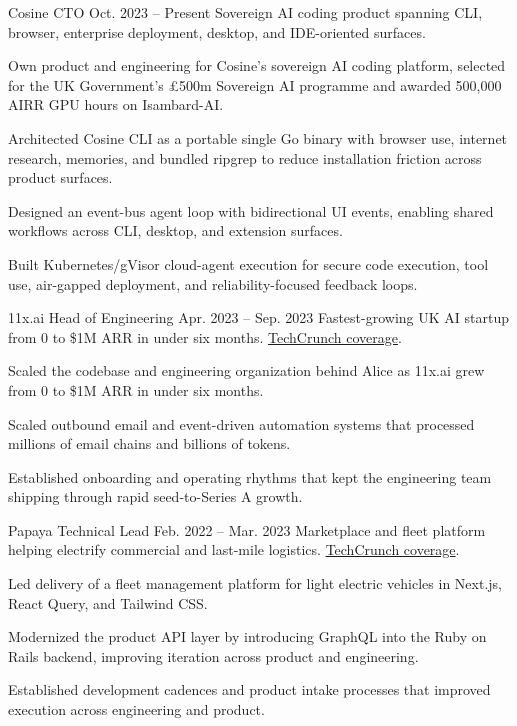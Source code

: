 
\ResumeJob
  {Cosine}
  {CTO}
  {Oct. 2023 -- Present}
  {Sovereign AI coding product spanning CLI, browser, enterprise deployment, desktop, and IDE-oriented surfaces.}
\begin{ResumeList}
  \item Own product and engineering for Cosine's sovereign AI coding platform, selected for the UK Government's \pounds{}500m Sovereign AI programme and awarded 500,000 AIRR GPU hours on Isambard-AI.
  \item Architected Cosine CLI as a portable single Go binary with browser use, internet research, memories, and bundled ripgrep to reduce installation friction across product surfaces.
  \item Designed an event-bus agent loop with bidirectional UI events, enabling shared workflows across CLI, desktop, and extension surfaces.
  \item Built Kubernetes/gVisor cloud-agent execution for secure code execution, tool use, air-gapped deployment, and reliability-focused feedback loops.
\end{ResumeList}

\ResumeJob
  {11x.ai}
  {Head of Engineering}
  {Apr. 2023 -- Sep. 2023}
  {Fastest-growing UK AI startup from 0 to \$1M ARR in under six months. \href{https://techcrunch.com/2023/08/11/11xai-closes-2-million-pre-seed-to-create-autonomous-ai-workers/}{TechCrunch coverage}.}
\begin{ResumeList}
  \item Scaled the codebase and engineering organization behind Alice as 11x.ai grew from 0 to \$1M ARR in under six months.
  \item Scaled outbound email and event-driven automation systems that processed millions of email chains and billions of tokens.
  \item Established onboarding and operating rhythms that kept the engineering team shipping through rapid seed-to-Series A growth.
\end{ResumeList}

\ResumeJob
  {Papaya}
  {Technical Lead}
  {Feb. 2022 -- Mar. 2023}
  {Marketplace and fleet platform helping electrify commercial and last-mile logistics. \href{https://techcrunch.com/2022/09/27/papaya-wants-to-help-electrify-last-mile-logistics-in-europe/}{TechCrunch coverage}.}
\begin{ResumeList}
  \item Led delivery of a fleet management platform for light electric vehicles in Next.js, React Query, and Tailwind CSS.
  \item Modernized the product API layer by introducing GraphQL into the Ruby on Rails backend, improving iteration across product and engineering.
  \item Established development cadences and product intake processes that improved execution across engineering and product.
\end{ResumeList}

